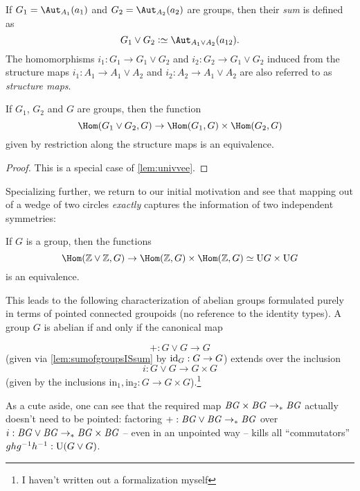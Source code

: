 \begin{definition}
  \label{def:sumofgroup}
  If $G_1=\aut_{A_1}(a_1)$ and $G_2=\aut_{A_2}(a_2)$ are groups, then their \emph{sum} is defined as
  $$G_1\vee G_2\defequi \aut_{A_1\vee A_2}(a_{12}).$$
  The homomorphisms $i_1:G_1\to G_1\vee G_2$ and $i_2:G_2\to G_1\vee G_2$ induced from the structure maps  $i_1:A_1\to A_1\vee A_2$ and  $i_2:A_2\to A_1\vee A_2$ are also referred to as \emph{structure maps}.
\end{definition}
\begin{lemma}
  \label{lem:sumofgroupsISsum} If $G_1$, $G_2$ and $G$ are groups, then the function
  $$\Hom(G_1\vee G_2,G)\to\Hom(G_1,G)\times\Hom(G_2,G)$$
given by restriction along the structure maps is an equivalence.
\end{lemma}
\begin{proof}
  This is a special case of \cref{lem:univvee}.
\end{proof}
Specializing further, we return to our initial motivation and see that mapping out of a wedge of two circles \emph{exactly} captures the information of two independent symmetries:
\begin{corollary}
  \label{cor:ZplusZuniv}
  If $G$ is a group, then the functions
  $$\Hom(\ZZ\vee\ZZ,G)\to \Hom(\ZZ,G)\times\Hom(\ZZ,G)\simeq \USym G\times \USym G$$
  is an equivalence.
\end{corollary}
\begin{xca}
This leads to the following characterization of abelian groups formulated purely in terms of pointed connected groupoids (no reference to the identity types).
  \label{xca:whatAREabeliangroups}
  A group $G$ is abelian if and only if the canonical map

$$+:G\vee G\to G$$
(given via \cref{lem:sumofgroupsISsum} by $\mathord{\mathrm{id}}_G:G\to G$) extends over the inclusion
$$i:G\vee G\to G\times G$$
(given by the inclusions $\mathrm{in}_1,\mathrm{in}_2:G\to G\times G$).\footnote{I haven't written out a formalization myself}

As a cute aside, one can see that the required map $\mathit{B}\mathit{G}\times\mathit{B}\mathit{G}\to_*\mathit{B}\mathit{G}$ actually doesn't need to be pointed:
factoring $+:\mathit{B}\mathit{G}\vee\mathit{B}\mathit{G}\to_*\mathit{B}\mathit{G}$ over $i:\mathit{B}\mathit{G}\vee\mathit{B}\mathit{G}\to_*\mathit{B}\mathit{G}\times\mathit{B}\mathit{G}$
-- even in an unpointed way -- kills all ``commutators''
$ghg^{-1}h^{-1}:\mathrm{U}(G\vee G)$.
\end{xca}

